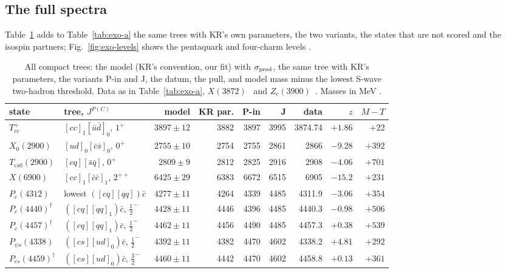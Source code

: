 \subsection{The full spectra}\label{app:exotics-spectra}

Table~\ref{tab:exo-full} adds to Table~\ref{tab:exo-a} the same trees with KR's own parameters, the two variants, the states that are not
scored and the isospin partners; Fig.~\ref{fig:exo-levels} shows the pentaquark and four-charm levels .

\begin{table}[tbp]\centering\footnotesize\setlength{\tabcolsep}{2.8pt}
\caption{All compact trees: the model (KR's convention, our fit) with $\sigma_{\rm pred}$, the same tree with KR's parameters, the
variants P-in and J, the datum, the pull, and model mass minus the lowest S-wave two-hadron threshold. Data as in Table~\ref{tab:exo-a},
$X(3872)$~\cite{lhcb2020k} and $Z_c(3900)$~\cite{besiii2013h}. Masses in MeV .}
\label{tab:exo-full}
\begin{tabular}{@{}llrrrrrrr@{}}
\toprule
state & tree, $J^{P(C)}$ & model & KR par. & P-in & J & data & $z$ & $M-T$ \\
\midrule
$T_{cc}^+$ & $[cc]_1[\bar u\bar d]_0$, $1^+$ & $3897\pm12$ & 3882 & 3897 & 3995 & 3874.74 & $+1.86$ & $+22$ \\
$X_0(2900)$ & $[ud]_0[\bar c\bar s]_0$, $0^+$ & $2755\pm10$ & 2754 & 2755 & 2861 & 2866 & $-9.28$ & $+392$ \\
$T_{c\bar s0}(2900)$ & $[cq][\bar s\bar q]$, $0^+$ & $2809\pm9$ & 2812 & 2825 & 2916 & 2908 & $-4.06$ & $+701$ \\
$X(6900)$ & $[cc]_1[\bar c\bar c]_1$, $2^{++}$ & $6425\pm29$ & 6383 & 6672 & 6515 & 6905 & $-15.2$ & $+231$ \\
$P_c(4312)$ & lowest $([cq][qq])\bar c$ & $4277\pm11$ & 4264 & 4339 & 4485 & 4311.9 & $-3.06$ & $+354$ \\
$P_c(4440)^\dagger$ & $([cq][qq]_1)\bar c$, $\frac12^-$ & $4428\pm11$ & 4446 & 4396 & 4485 & 4440.3 & $-0.98$ & $+506$ \\
$P_c(4457)^\dagger$ & $([cq][qq]_1)\bar c$, $\frac12^-$ & $4462\pm11$ & 4456 & 4490 & 4485 & 4457.3 & $+0.38$ & $+539$ \\
$P_{\psi s}(4338)$ & $([cs][ud]_0)\bar c$, $\frac12^-$ & $4392\pm11$ & 4382 & 4470 & 4602 & 4338.2 & $+4.81$ & $+292$ \\
$P_{cs}(4459)^\dagger$ & $([cs][ud]_0)\bar c$, $\frac32^-$ & $4460\pm11$ & 4442 & 4470 & 4602 & 4458.8 & $+0.13$ & $+361$ \\

\end{tabular}
\end{table}
